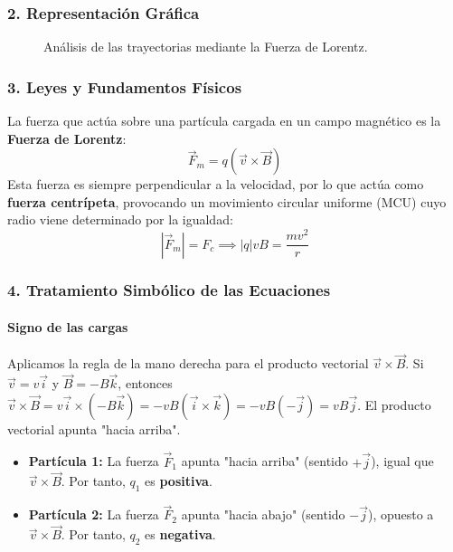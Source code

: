 \subsubsection*{2. Representación Gráfica}
\begin{figure}[H]
    \centering
    \caption{Análisis de las trayectorias mediante la Fuerza de Lorentz.}
\end{figure}

\subsubsection*{3. Leyes y Fundamentos Físicos}
La fuerza que actúa sobre una partícula cargada en un campo magnético es la \textbf{Fuerza de Lorentz}:
$$ \vec{F}_m = q(\vec{v} \times \vec{B}) $$
Esta fuerza es siempre perpendicular a la velocidad, por lo que actúa como \textbf{fuerza centrípeta}, provocando un movimiento circular uniforme (MCU) cuyo radio viene determinado por la igualdad:
$$ |\vec{F}_m| = F_c \implies |q|vB = \frac{mv^2}{r} $$

\subsubsection*{4. Tratamiento Simbólico de las Ecuaciones}
\paragraph*{Signo de las cargas}
Aplicamos la regla de la mano derecha para el producto vectorial $\vec{v} \times \vec{B}$. Si $\vec{v} = v\vec{i}$ y $\vec{B} = -B\vec{k}$, entonces $\vec{v} \times \vec{B} = v\vec{i} \times (-B\vec{k}) = -vB (\vec{i} \times \vec{k}) = -vB(-\vec{j}) = vB\vec{j}$. El producto vectorial apunta "hacia arriba".
\begin{itemize}
    \item \textbf{Partícula 1:} La fuerza $\vec{F}_1$ apunta "hacia arriba" (sentido $+\vec{j}$), igual que $\vec{v} \times \vec{B}$. Por tanto, $q_1$ es \textbf{positiva}.
    \item \textbf{Partícula 2:} La fuerza $\vec{F}_2$ apunta "hacia abajo" (sentido $-\vec{j}$), opuesto a $\vec{v} \times \vec{B}$. Por tanto, $q_2$ es \textbf{negativa}.
\end{itemize}

